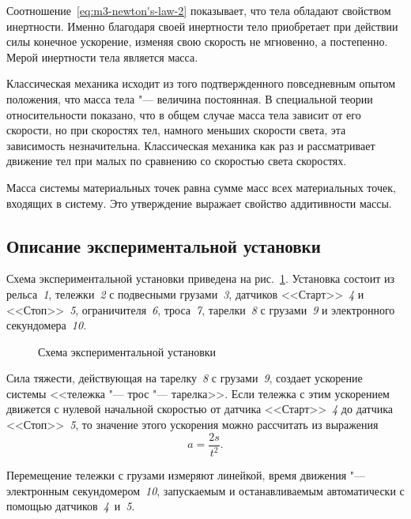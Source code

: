 \documentclass[a4paper, 12pt]{extarticle}
\begin{document}
Соотношение~\eqref{eq:m3-newton's-law-2} показывает, что тела обладают свойством инертности. Именно благодаря своей инертности тело приобретает при действии силы конечное ускорение, изменяя свою скорость не мгновенно, а постепенно. Мерой инертности тела является масса.

Классическая механика исходит из того подтвержденного повседневным опытом положения, что масса тела "--- величина постоянная. В специальной теории относительности показано, что в общем случае масса тела зависит от его скорости, но при скоростях тел, намного меньших скорости света, эта зависимость незначительна. Классическая механика как раз и рассматривает движение тел при малых по сравнению со скоростью света скоростях.

Масса системы материальных точек равна сумме масс всех материальных точек, входящих в систему. Это утверждение выражает свойство аддитивности массы.

\subsection{Описание экспериментальной установки}
Схема экспериментальной установки приведена на рис.~\ref{fig:m3-}. Установка состоит из рельса~\emph{1}, тележки~\emph{2} с подвесными грузами~\emph{3}, датчиков <<Старт>>~\emph{4} и <<Стоп>>~\emph{5}, ограничителя~\emph{6}, троса~\emph{7}, тарелки~\emph{8} с грузами~\emph{9} и электронного секундомера~\emph{10}.

\begin{figure}[h]
\begin{center}
\end{center}
\caption{Схема экспериментальной установки \label{fig:m3-}}
\end{figure}

Сила тяжести, действующая на тарелку~\emph{8} с грузами~\emph{9}, создает ускорение системы <<тележка "--- трос "--- тарелка>>. Если тележка с этим ускорением движется с нулевой начальной скоростью от датчика <<Старт>>~\emph{4} до датчика <<Стоп>>~\emph{5}, то значение этого ускорения можно рассчитать из выражения %
\begin{equation}
\label{eq:m3-acceleration}
a = \frac{2s}{t^2}.
\end{equation}

Перемещение тележки с грузами измеряют линейкой, время движения "--- электронным секундомером~\emph{10}, запускаемым и останавливаемым автоматически с помощью датчиков~\emph{4}~и~\emph{5}. %
\end{document}
